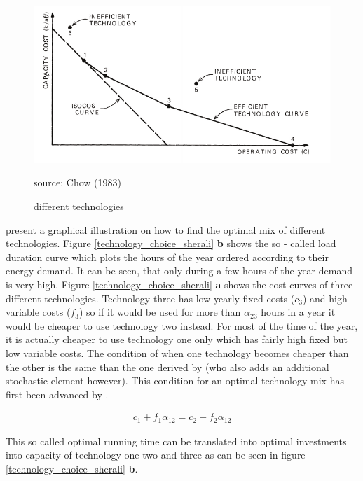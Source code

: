 \begin{figure}[h]
\centering
\includegraphics[width=.5\textwidth]{capacity/technology_choice_chow}
      \label{technology_choice_chow}            
      \caption{different technologies}
       source: Chow (1983)
\end{figure}

\cite{sherali1982} present a graphical illustration on how to find the optimal mix of different technologies. Figure \ref{technology_choice_sherali} \textbf{b} shows the so - called load duration curve which plots the hours of the year ordered according to their energy demand. It can be seen, that only during a few hours of the year demand is very high. Figure \ref{technology_choice_sherali} \textbf{a} shows the cost curves of three different technologies. Technology three has low yearly fixed costs ($c_3$) and high variable costs ($f_3$) so if it would be used for more than $\alpha_{23}$ hours in a year it would be cheaper to use technology two instead. For most of the time of the year, it is actually cheaper to use technology one only which has fairly high fixed but low variable costs. The condition of when one technology becomes cheaper than the other is the same than the one derived by \cite{chow1983} (who also adds an additional stochastic element however). This condition for an optimal technology mix has first been advanced by \cite{Turvey1968}.

\begin{eqnarray}
	c_1 + f_1 \alpha_{12} = c_2 + f_2 \alpha_{12}
\end{eqnarray}

This so called optimal running time can be translated into optimal investments into capacity of technology one two and three as can be seen in figure \ref{technology_choice_sherali} \textbf{b}.

